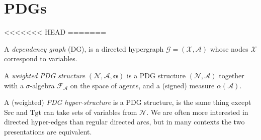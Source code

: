 \documentclass[twoside]{article} %
\theoremstyle{plain}
\theoremstyle{definition}
\newcommand{\N}{\mathcal N}
\newcommand{\X}{\mathcal X}
\newcommand{\Ar}{\mathcal A}
\newcommand{\src}{\mathrm{Src}}
\newcommand{\tgt}{\mathrm{Tgt}}
\newcommand{\balpha}{\boldsymbol\alpha}
\newcommand{\dg}[1]{\mathbdcal{#1}}
\newcommand{\ed}[3]{#2%
    	  \overset{\smash{\mskip-5mu\raisebox{-1pt}{$\scriptscriptstyle
    	        #1$}}}{\rightarrow} #3}
\newcommand{\TODO}[1][INCOMPLETE]{{\centering\Large\color{red}$\langle$~\texttt{#1}~$\rangle$\par}}
\begin{document}
    

    \section{PDGs}
<<<<<<< HEAD
=======
    \begin{defn}
        A \emph{dependency graph} (DG), is a directed hypergraph
        $\mathcal G = (\X, \Ar)$
        whose nodes $\X$ correspond to variables.
    \end{defn}
    
    
    \begin{defn}
        A \emph{weighted PDG structure} $(\N, \Ar, \balpha)$ is a PDG structure $(\N, \Ar)$ together with a $\sigma$-algebra $\mathcal F_{\!\Ar}$ on the space of agents, and a (signed) measure $\alpha(\mathcal A)$.
        
    \end{defn}
    
    A  (weighted) \emph{PDG hyper-structure} is a PDG structure, is the same thing except $\src$ and $\tgt$ can take sets of variables from $\N$.
    We are often more interested in directed hyper-edges than regular directed arcs, but in many contexts the two presentations are equivalent.
    
\end{document}
